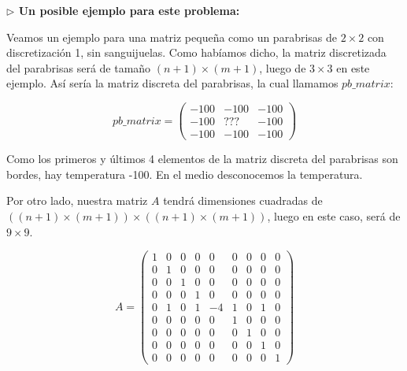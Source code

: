 \vspace{\baselineskip}

{\large \textbf{ $\rhd$ Un posible ejemplo para este problema:}}

\vspace{\baselineskip}

Veamos un ejemplo para una matriz pequeña como un parabrisas de $2 \times 2$ con discretización 1, sin sanguijuelas. Como habíamos dicho, la matriz discretizada del parabrisas será de tamaño $(n+1) \times (m+1)$, luego de $3 \times 3$ en este ejemplo. Así sería la matriz discreta del parabrisas, la cual llamamos $pb\_matrix$: 

\vspace{\baselineskip}

\[ pb\_matrix = \left( \begin{array}{ccc}
-100 & -100 & -100 \\
-100 & ??? & -100 \\
-100 & -100 & -100 
\end{array} \right)\] 

\vspace{\baselineskip}

Como los primeros y últimos 4 elementos de la matriz discreta del parabrisas son bordes, hay temperatura -100. En el medio desconocemos la temperatura.

Por otro lado, nuestra matriz $A$ tendrá dimensiones cuadradas de $((n+1) \times (m+1)) \times  ((n+1) \times (m+1))$, luego en este caso, será de $9 \times 9$.

\vspace{\baselineskip}

\[A = \left( \begin{array}{ccccccccc}
1 & 0 & 0 & 0 & 0 & 0 & 0 & 0 & 0 \\
0 & 1 & 0 & 0 & 0 & 0 & 0 & 0 & 0 \\
0 & 0 & 1 & 0 & 0 & 0 & 0 & 0 & 0 \\ 
0 & 0 & 0 & 1 & 0 & 0 & 0 & 0 & 0 \\
0 & 1 & 0 & 1 & -4 & 1 & 0 & 1 & 0 \\
0 & 0 & 0 & 0 & 0 & 1 & 0 & 0 & 0 \\ 
0 & 0 & 0 & 0 & 0 & 0 & 1 & 0 & 0 \\
0 & 0 & 0 & 0 & 0 & 0 & 0 & 1 & 0 \\
0 & 0 & 0 & 0 & 0 & 0 & 0 & 0 & 1
\end{array} \right)\] 

\vspace{\baselineskip}

